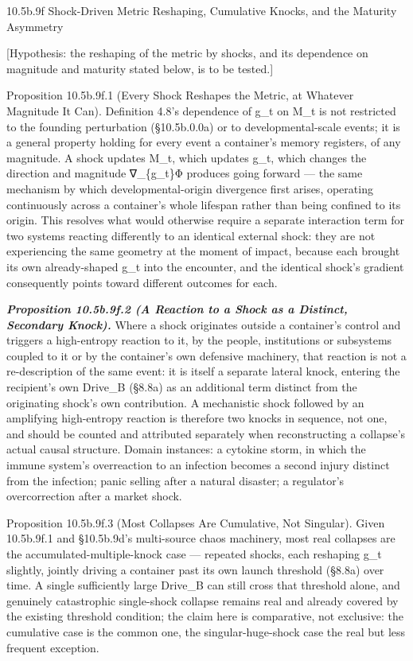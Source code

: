 \documentclass[
]{article}
\begin{document}
10.5b.9f Shock-Driven Metric Reshaping, Cumulative Knocks, and the
Maturity Asymmetry

{[}Hypothesis: the reshaping of the metric by shocks, and its dependence
on magnitude and maturity stated below, is to be tested.{]}

Proposition 10.5b.9f.1 (Every Shock Reshapes the Metric, at Whatever
Magnitude It Can). Definition 4.8's dependence of g\_t on M\_t is not
restricted to the founding perturbation (§10.5b.0.0a) or to
developmental-scale events; it is a general property holding for every
event a container's memory registers, of any magnitude. A shock updates
M\_t, which updates g\_t, which changes the direction and magnitude
∇\_\{g\_t\}Φ produces going forward --- the same mechanism by which
developmental-origin divergence first arises, operating continuously
across a container's whole lifespan rather than being confined to its
origin. This resolves what would otherwise require a separate
interaction term for two systems reacting differently to an identical
external shock: they are not experiencing the same geometry at the
moment of impact, because each brought its own already-shaped g\_t into
the encounter, and the identical shock's gradient consequently points
toward different outcomes for each.

\emph{\textbf{Proposition 10.5b.9f.2 (A Reaction to a Shock as a
Distinct, Secondary Knock).}} Where a shock originates outside a
container's control and triggers a high-entropy reaction to it, by the
people, institutions or subsystems coupled to it or by the container's
own defensive machinery, that reaction is not a re-description of the
same event: it is itself a separate lateral knock, entering the
recipient's own Drive\_B (§8.8a) as an additional term distinct from the
originating shock's own contribution. A mechanistic shock followed by an
amplifying high-entropy reaction is therefore two knocks in sequence,
not one, and should be counted and attributed separately when
reconstructing a collapse's actual causal structure. Domain instances: a
cytokine storm, in which the immune system's overreaction to an
infection becomes a second injury distinct from the infection; panic
selling after a natural disaster; a regulator's overcorrection after a
market shock.

Proposition 10.5b.9f.3 (Most Collapses Are Cumulative, Not Singular).
Given 10.5b.9f.1 and §10.5b.9d's multi-source chaos machinery, most real
collapses are the accumulated-multiple-knock case --- repeated shocks,
each reshaping g\_t slightly, jointly driving a container past its own
launch threshold (§8.8a) over time. A single sufficiently large Drive\_B
can still cross that threshold alone, and genuinely catastrophic
single-shock collapse remains real and already covered by the existing
threshold condition; the claim here is comparative, not exclusive: the
cumulative case is the common one, the singular-huge-shock case the real
but less frequent exception.
\end{document}
